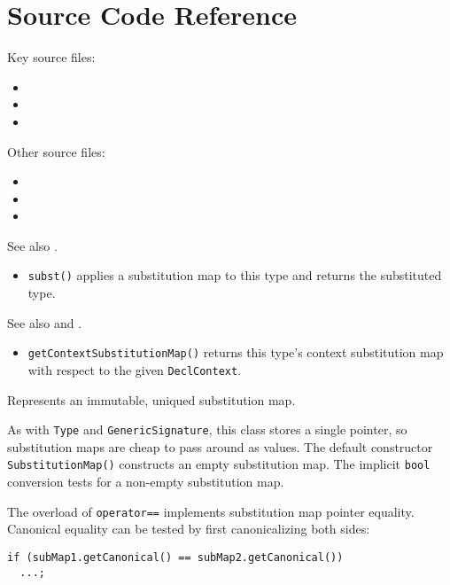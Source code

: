 \documentclass[../generics]{subfiles}
\begin{document}
\section{Source Code Reference}\label{substmapsourcecoderef}

Key source files:
\begin{itemize}
\item {}
\item {}
\item {}
\end{itemize}
Other source files:
\begin{itemize}
\item {}
\item {}
\item {}
\end{itemize}

See also .
\begin{itemize}
\item \texttt{subst()} applies a substitution map to this type and returns the substituted type.
\end{itemize}

See also  and .
\begin{itemize}
\item \texttt{getContextSubstitutionMap()} returns this type's context substitution map with respect to the given \texttt{DeclContext}.
\end{itemize}

Represents an immutable, uniqued substitution map.

As with \texttt{Type} and \texttt{GenericSignature}, this class stores a single pointer, so substitution maps are cheap to pass around as values. The default constructor \texttt{SubstitutionMap()} constructs an empty substitution map. The implicit \texttt{bool} conversion tests for a non-empty substitution map.

The overload of \texttt{operator==} implements substitution map pointer equality. Canonical equality can be tested by first canonicalizing both sides:
\begin{Verbatim}
if (subMap1.getCanonical() == subMap2.getCanonical())
  ...;
\end{Verbatim}
\end{document}
